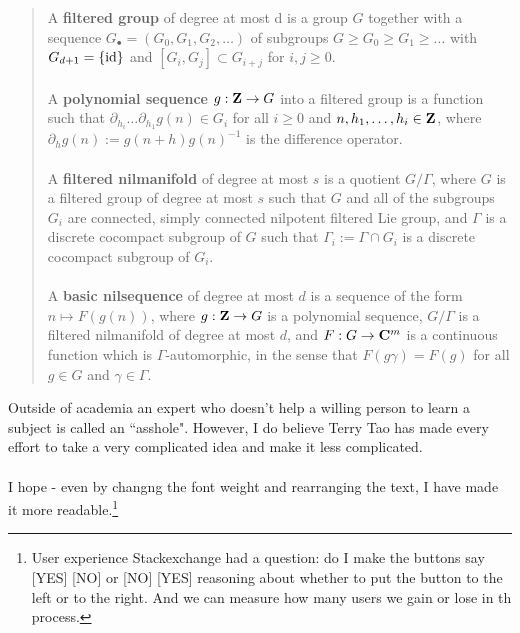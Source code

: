 \documentclass[12pt]{article}
\begin{document}
\begin{quotation}\noindent A \textbf{filtered group} of degree at most {d} is a group  ${G}$ together with a sequence ${G_\bullet = (G_0,G_1,G_2,\dots)}$ of subgroups ${G \geq G_0 \geq G_1 \geq \dots}$ with ${G_{d+1}=\{\hbox{id}\}}$ and ${[G_i,G_j] \subset G_{i+j}}$ for ${i,j \geq 0}$. \\ \\
A \textbf{polynomial sequence} ${g: {\bf Z} \rightarrow G}$ into a filtered group is a function such that ${\partial_{h_i} \dots \partial_{h_1} g(n) \in G_i}$ for all ${i \geq 0}$ and ${n,h_1,\dots,h_i \in{\bf Z}}$, where ${\partial_h g(n) := g(n+h) g(n)^{-1}}$ is the difference operator. \\ \\
A \textbf{filtered nilmanifold} of degree at most ${s}$ is a quotient ${G/\Gamma}$, where ${G}$ is a filtered group of degree at most ${s}$ such that  ${G}$ and all of the subgroups ${G_i}$ are connected, simply connected nilpotent filtered Lie group, and ${\Gamma}$ is a discrete cocompact subgroup of ${G}$ such that ${\Gamma_i := \Gamma \cap G_i}$ is a discrete cocompact subgroup of ${G_i}$. \\ \\
A \textbf{basic nilsequence} of degree at most ${d}$ is a sequence of the form ${n \mapsto F(g(n))}$, where ${g: {\bf Z} \rightarrow G}$ is a polynomial sequence, ${G/\Gamma}$ is a filtered nilmanifold of degree at most ${d}$, and ${F: G \rightarrow {\bf C}^m}$ is a continuous function which is ${\Gamma}$-automorphic, in the sense that ${F(g \gamma) = F(g)}$ for all ${g \in G}$ and ${\gamma \in \Gamma}$.
\end{quotation}
Outside of academia an expert who doesn't help a willing person to learn a subject is called an ``asshole".  However, I do believe Terry Tao has made every effort to take a very complicated idea and make it less complicated. \\ \\
I hope - even by changng the font weight and rearranging the text, I have made it more readable.\footnote{User experience Stackexchange had a question:  do I make the buttons say [{\color{green}YES}] [{\color{red}NO}] or [{\color{red}NO}] [{\color{green}YES}] reasoning about whether to put the button to the left or to the right.  And we can measure how many users we gain or lose in th process.}

\newpage
\end{document}
